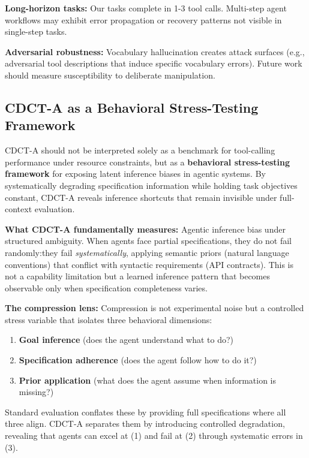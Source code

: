 \documentclass[11pt]{article}
\begin{document}
\textbf{Long-horizon tasks:} Our tasks complete in 1-3 tool calls. Multi-step agent workflows may exhibit error propagation or recovery patterns not visible in single-step tasks.

\textbf{Adversarial robustness:} Vocabulary hallucination creates attack surfaces (e.g., adversarial tool descriptions that induce specific vocabulary errors). Future work should measure susceptibility to deliberate manipulation.

\subsection{CDCT-A as a Behavioral Stress-Testing Framework}

CDCT-A should not be interpreted solely as a benchmark for tool-calling performance under resource constraints, but as a \textbf{behavioral stress-testing framework} for exposing latent inference biases in agentic systems. By systematically degrading specification information while holding task objectives constant, CDCT-A reveals inference shortcuts that remain invisible under full-context evaluation.

\textbf{What CDCT-A fundamentally measures:} Agentic inference bias under structured ambiguity. When agents face partial specifications, they do not fail randomly:they fail \emph{systematically}, applying semantic priors (natural language conventions) that conflict with syntactic requirements (API contracts). This is not a capability limitation but a learned inference pattern that becomes observable only when specification completeness varies.

\textbf{The compression lens:} Compression is not experimental noise but a controlled stress variable that isolates three behavioral dimensions:
\begin{enumerate}
\item \textbf{Goal inference} (does the agent understand what to do?)
\item \textbf{Specification adherence} (does the agent follow how to do it?)
\item \textbf{Prior application} (what does the agent assume when information is missing?)
\end{enumerate}

Standard evaluation conflates these by providing full specifications where all three align. CDCT-A separates them by introducing controlled degradation, revealing that agents can excel at (1) and fail at (2) through systematic errors in (3).
\end{document}
